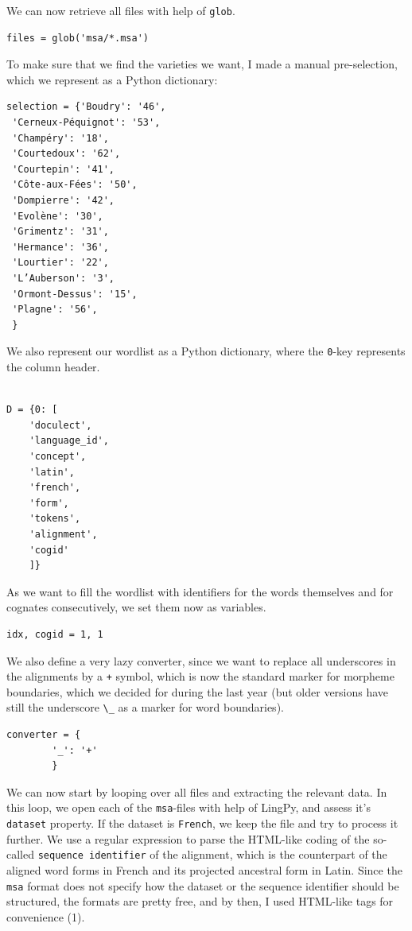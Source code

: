 \documentclass[
  a4paper,
  14pt,
  oneside,
  tablecaptionabove
]{scrbook}
\newcommand{\passthrough}[1]{#1}
\begin{document}
We can now retrieve all files with help of
\passthrough{\lstinline!glob!}.

\begin{lstlisting}
files = glob('msa/*.msa')
\end{lstlisting}

To make sure that we find the varieties we want, I made a manual
pre-selection, which we represent as a Python dictionary:

\begin{lstlisting}
selection = {'Boudry': '46',
 'Cerneux-Péquignot': '53',
 'Champéry': '18',
 'Courtedoux': '62',
 'Courtepin': '41',
 'Côte-aux-Fées': '50',
 'Dompierre': '42',
 'Evolène': '30',
 'Grimentz': '31',
 'Hermance': '36',
 'Lourtier': '22',
 'L’Auberson': '3',
 'Ormont-Dessus': '15',
 'Plagne': '56',
 }
\end{lstlisting}

We also represent our wordlist as a Python dictionary, where the
\passthrough{\lstinline!0!}-key represents the column header.\\
~\\

\begin{lstlisting}
D = {0: [
    'doculect',
    'language_id',
    'concept',
    'latin',
    'french',
    'form',
    'tokens',
    'alignment',
    'cogid'
    ]}
\end{lstlisting}

As we want to fill the wordlist with identifiers for the words
themselves and for cognates consecutively, we set them now as variables.

\begin{lstlisting}
idx, cogid = 1, 1
\end{lstlisting}

We also define a very lazy converter, since we want to replace all
underscores in the alignments by a \passthrough{\lstinline!+!} symbol,
which is now the standard marker for morpheme boundaries, which we
decided for during the last year (but older versions have still the
underscore \passthrough{\lstinline!\_!} as a marker for word
boundaries).

\begin{lstlisting}
converter = {
        '_': '+'
        }
\end{lstlisting}

We can now start by looping over all files and extracting the relevant
data. In this loop, we open each of the
\passthrough{\lstinline!msa!}-files with help of LingPy, and assess it's
\passthrough{\lstinline!dataset!} property. If the dataset is
\passthrough{\lstinline!French!}, we keep the file and try to process
it further. We use a regular expression to parse the HTML-like coding of
the so-called \passthrough{\lstinline!sequence identifier!} of the
alignment, which is the counterpart of the aligned word forms in French
and its projected ancestral form in Latin. Since the
\passthrough{\lstinline!msa!} format does not specify how the dataset or
the sequence identifier should be structured, the formats are pretty
free, and by then, I used HTML-like tags for convenience (1).
\end{document}
